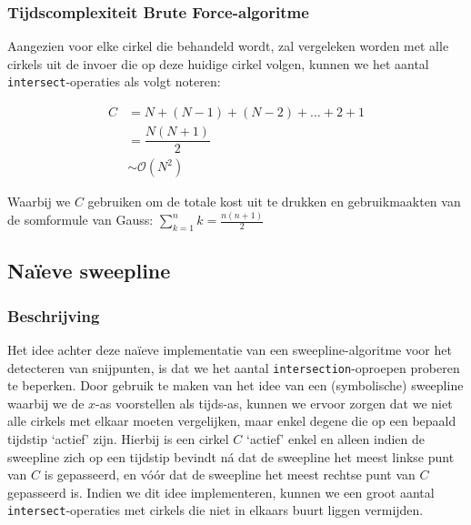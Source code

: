 \documentclass[12pt]{article}
\begin{document}
\subsubsection{Tijdscomplexiteit Brute Force-algoritme}\label{sec:brute-force}
Aangezien voor elke cirkel die behandeld wordt, zal vergeleken worden met alle cirkels uit de invoer die op deze huidige cirkel volgen, kunnen we het aantal \texttt{intersect}-operaties als volgt noteren:

\begin{align*}
C &= N + (N-1) + (N-2) + \ldots + 2 + 1\\
&= \dfrac{N(N+1)}{2}\\
&\sim \mathcal{O}(N^2)
\end{align*}


Waarbij we $ C $ gebruiken om de totale kost uit te drukken en gebruikmaakten van de somformule van Gauss: $ \sum_{k=1}^{n} k = \frac{n(n+1)}{2}$ 

\subsection{Naïeve sweepline}
\subsubsection{Beschrijving}

Het idee achter deze naïeve implementatie van een sweepline-algoritme voor het detecteren van snijpunten, is dat we het aantal \texttt{intersection}-oproepen proberen te beperken. Door gebruik te maken van het idee van een (symbolische) sweepline waarbij we de $ x $-as voorstellen als tijds-as, kunnen we ervoor zorgen dat we niet alle cirkels met elkaar moeten vergelijken, maar enkel degene die op een bepaald tijdstip `actief' zijn. Hierbij is een cirkel $ C $ `actief' enkel en alleen indien de sweepline zich op een tijdstip bevindt ná dat de sweepline het meest linkse punt van $ C $ is gepasseerd, en vóór dat de sweepline het meest rechtse punt van $ C $ gepasseerd is. Indien we dit idee implementeren, kunnen we een groot aantal \texttt{intersect}-operaties met cirkels die niet in elkaars buurt liggen vermijden. 
\end{document}
